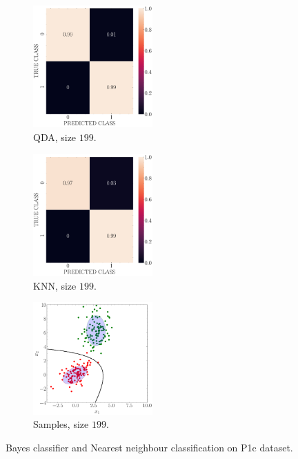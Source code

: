 \documentclass[12pt, a4 paper]{article}
\begin{document}
\begin{figure}[!htbp]
\quad \quad
    \begin{subfigure}[!htbp]{0.24\textwidth}
       \centering
       \includegraphics[width=1.8in]{../results/ex1/conf_mtx_QD_ML_dataset_P1c_size_199.pdf}
       \caption{QDA, size $199$.}
       \label{fig:KNN_P1c_199}
    \end{subfigure}
\quad \quad
    \begin{subfigure}[!htbp]{0.24\textwidth}
       \centering
       \includegraphics[width=1.8in]{../results/ex1/conf_mtx_KNN_dataset_P1c_size_199.pdf}
       \caption{KNN, size $199$.}
       \label{fig:KNN_P1c_199}
    \end{subfigure}
\quad \quad
    \begin{subfigure}[!htbp]{0.24\textwidth}
       \centering
       \includegraphics[width=1.8in]{../results/ex1/samples_QD_ML_dataset_P1c_size_199.pdf}
       \caption{Samples, size $199$.}
       \label{fig:KNN_P1c_199}
    \end{subfigure}
\caption{Bayes classifier and Nearest neighbour classification on P1c dataset.}
\label{fig:ex11P1c}
\end{figure}
\end{document}
